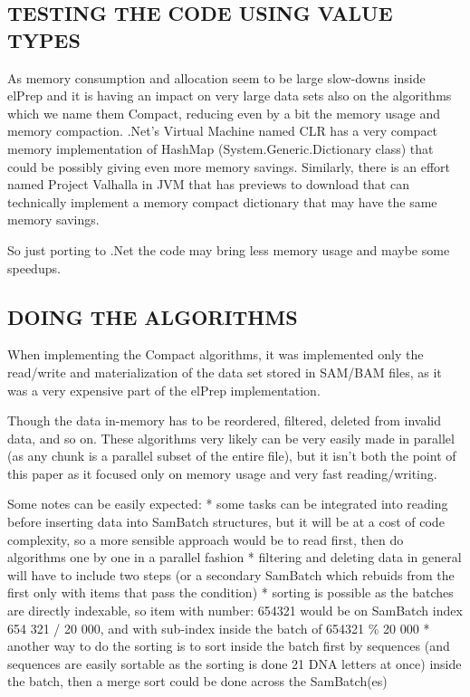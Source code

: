 \documentclass[a4paper,twoside]{article}
\begin{document}
\subsection{\uppercase{Testing the code using Value Types}}\label{subsec:uppercase4}

As memory consumption and allocation seem to be large slow-downs inside elPrep and it is having an impact on very large data sets also on the algorithms which we name them Compact,
reducing even by a bit the memory usage and memory compaction.
.Net's Virtual Machine named CLR has a very compact memory implementation of HashMap (System.Generic.Dictionary class) that could be possibly giving even more memory savings.
Similarly, there is an effort named Project Valhalla in JVM that has previews to download that can technically implement a memory compact dictionary that may have the same memory savings.

So just porting to .Net the code may bring less memory usage and maybe some speedups.

\subsection{\uppercase{Doing the algorithms}}\label{subsec:uppercase3}

When implementing the Compact algorithms, it was implemented only the read/write and materialization of the data set stored in SAM/BAM files, as it was a very expensive part of the
elPrep implementation.

Though the data in-memory has to be reordered, filtered, deleted from invalid data, and so on.
These algorithms very likely can be very easily made in parallel (as any chunk is a parallel subset of the entire file), but it isn't both the point of this paper as it focused
only on memory usage and very fast reading/writing.

Some notes can be easily expected:
* some tasks can be integrated into reading before inserting data into SamBatch structures, but it will be at a cost of code complexity,
so a more sensible approach would be to read first, then do algorithms one by one in a parallel fashion
* filtering and deleting data in general will have to include two steps (or a secondary SamBatch which rebuids from the first only with items that pass the condition)
* sorting is possible as the batches are directly indexable, so item with number: 654321 would be on SamBatch index 654 321 / 20 000, and with sub-index inside the batch of 654321 \% 20 000
* another way to do the sorting is to sort inside the batch first by sequences (and sequences are easily sortable as the sorting is done 21 DNA letters at once) inside the batch,
then a merge sort could be done across the SamBatch(es)
\end{document}
